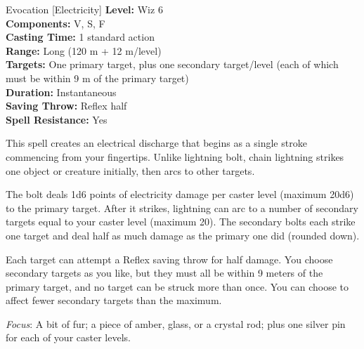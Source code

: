 {Evocation [Electricity]}
{
	\textbf{Level:}
	Wiz 6\\
	\textbf{Components:}
	V, S, F\\
	\textbf{Casting Time:}
	1 standard action\\
	\textbf{Range:}
	Long (120 m + 12 m/level)\\
	\textbf{Targets:}
	One primary target, plus one secondary target/level (each of which must be within 9 m of the primary target)\\
	\textbf{Duration:}
	Instantaneous\\
	\textbf{Saving Throw:}
	Reflex half\\
	\textbf{Spell Resistance:}
	Yes\\
}
{
	This spell creates an electrical discharge that begins as a single stroke commencing from your fingertips. Unlike lightning bolt, chain lightning strikes one object or creature initially, then arcs to other targets.

	The bolt deals 1d6 points of electricity damage per caster level (maximum 20d6) to the primary target. After it strikes, lightning can arc to a number of secondary targets equal to your caster level (maximum 20). The secondary bolts each strike one target and deal half as much damage as the primary one did (rounded down).

	Each target can attempt a Reflex saving throw for half damage. You choose secondary targets as you like, but they must all be within 9 meters of the primary target, and no target can be struck more than once. You can choose to affect fewer secondary targets than the maximum.

	\textit{Focus}:
	A bit of fur; a piece of amber, glass, or a crystal rod; plus one silver pin for each of your caster levels.

}
